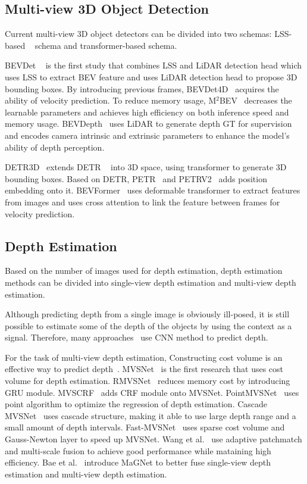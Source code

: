 \documentclass[letterpaper]{article} \usepackage[]{aaai23}  \usepackage{times}  \usepackage{helvet}  \usepackage{courier}  \usepackage[hyphens]{url}  \usepackage{graphicx} \urlstyle{rm} \def\UrlFont{\rm}  \usepackage{natbib}  \usepackage{caption} \frenchspacing  \setlength{\pdfpagewidth}{8.5in} \setlength{\pdfpageheight}{11in} \usepackage{algorithm}
\begin{document}
\subsection{Multi-view 3D Object Detection}
Current multi-view 3D object detectors can be divided into two schemas: LSS-based ~\cite{philion2020lift} schema and transformer-based schema. 

BEVDet ~\cite{huang2021bevdet} is the first study that combines LSS and LiDAR detection head which uses LSS to extract BEV feature and uses LiDAR detection head to propose 3D bounding boxes. By introducing previous frames, BEVDet4D~\cite{huang2022bevdet4d} acquires the ability of velocity prediction. To reduce memory usage, M$^2$BEV~\cite{xie2022m}  decreases the learnable parameters and achieves high efficiency on both inference speed and memory usage. BEVDepth~\cite{li2022bevdepth} uses LiDAR to generate depth GT for supervision and encodes camera intrinsic and extrinsic parameters to enhance the model's ability of depth perception.

DETR3D~\cite{wang2022detr3d} extends DETR ~\cite{carion2020end} into 3D space, using transformer to generate 3D bounding boxes. Based on DETR, PETR~\cite{liu2022petr} and PETRV2~\cite{liu2022petrv2} adds position embedding onto it. BEVFormer~\cite{li2022bevformer} uses deformable transformer to extract features from images and uses cross attention to link the feature between frames for velocity prediction. 

\subsection{Depth Estimation}
Based on the number of images used for depth estimation, depth estimation methods can be divided into single-view depth estimation and multi-view depth estimation.

Although predicting depth from a single image is obviously ill-posed, it is still possible to estimate some of the depth of the objects by using the context as a signal. Therefore, many approaches~\cite{bhat2021adabins, eigen2015predicting, eigen2014depth, fu2018deep} use CNN method to predict depth.

For the task of multi-view depth estimation, Constructing cost volume is an effective way to predict depth~\cite{mvs_survery, aa_rmvsnet, bidirectional}. MVSNet~\cite{yao2018mvsnet} is the first research that uses cost volume for depth estimation. RMVSNet~\cite{yao2019recurrent} reduces memory cost by introducing GRU module. MVSCRF~\cite{xue2019mvscrf} adds CRF module onto MVSNet. PointMVSNet~\cite{chen2019point} uses point algorithm to optimize the regression of depth estimation. Cascade MVSNet~\cite{gu2020cascade} uses cascade structure, making it able to use large depth range and a small amount of depth intervals. Fast-MVSNet~\cite{yu2020fast} uses sparse cost volume and Gauss-Newton layer to speed up MVSNet. Wang et al.~\cite{wang2021patchmatchnet} use adaptive patchmatch and multi-scale fusion to achieve good performance while mataining high efficiency. Bae et al.~\cite{bae2022multi} introduce MaGNet to better fuse single-view depth estimation and multi-view depth estimation.
\end{document}
